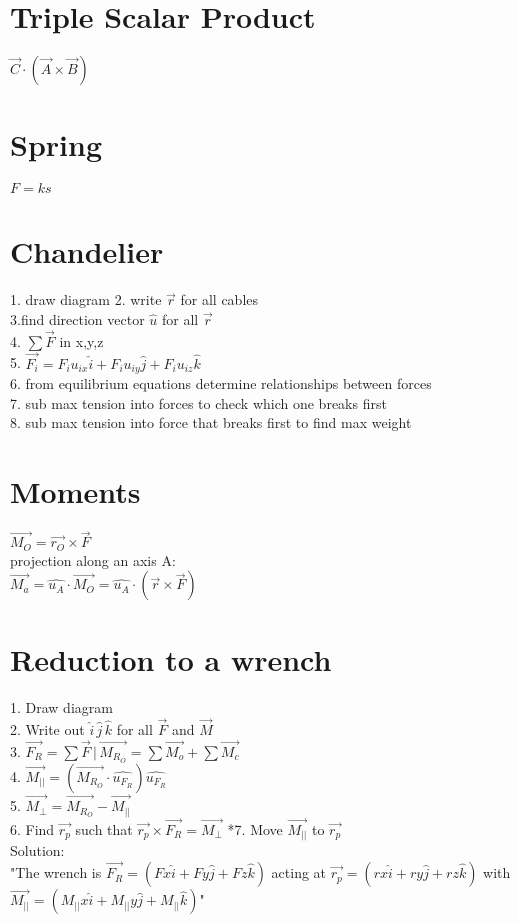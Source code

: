 \section*{Triple Scalar Product}

$\vec{C} \cdot (\vec{A} \times \vec{B})$

\section{Spring}
$F = ks$\\

\section*{Chandelier}
1. draw diagram
2. write $\vec{r}$ for all cables\\
3.find direction vector $\hat{u}$ for all $\vec{r}$\\
4. $\sum\vec{F}$ in x,y,z\\
5. $\vec{F_i} = F_iu_{ix} \hat{i} + F_iu_{iy} \hat{j}+ F_iu_{iz} \hat{k}$\\
6. from equilibrium equations determine relationships between forces\\
7. sub max tension into forces to check which one breaks first\\
8. sub max tension into force that breaks first to find max weight\\

\section*{Moments}
$\vec{M_O} = \vec{r_O} \times \vec{F}$\\
projection along an axis A:  \\$\vec{M_a} = \hat{u_A}\cdot\vec{M_O} =\hat{u_A}\cdot (\vec{r} \times \vec{F})$

\section*{Reduction to a wrench}
1. Draw diagram\\
2. Write out $\hat{i}\, \hat{j}\, \hat{k}$ for all $\vec{F}$ and $\vec{M}$\\
3. $\vec{F_R} = \sum\vec{F}\, | \, \vec{M_{R_O}} = \sum\vec{M_o} + \sum\vec{M_c}$\\
4. $\vec{M_{||}} = (\vec{M_{R_O}} \cdot \hat{u_{F_R}})\hat{u_{F_R}}$\\
5. $\vec{M_\perp} = \vec{M_{R_O}} - \vec{M_{||}}$\\
6. Find $\vec{r_p}$ such that $\vec{r_p} \times \vec{F_R} = \vec{M_\perp}$
*7. Move $\vec{M_{||}}$ to $\vec{r_p}$\\
Solution:\\
"The wrench is $\vec{F_R} = (Fx \hat{i} + Fy \hat{j} + Fz\hat{k})$ acting at $\vec{r_p} = (rx \hat{i} + ry \hat{j} + rz\hat{k})$ with $\vec{M_{||}} = (M_{||}x \hat{i} + M_{||}y\hat{j} + M_{||}\hat{k})$"